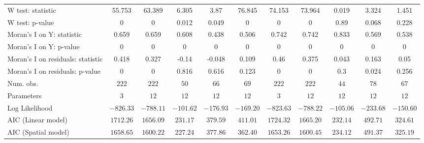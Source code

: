 \begin{table}
\begin{center}
\begin{tabular}{l c c c c c c c c c c}
W test: statistic                 & 55.753        & 63.389        & 6.305         & 3.87          & 76.845         & 74.153        & 73.964        & 0.019         & 3.324         & 1.451         \\
W test: p-value                   & 0             & 0             & 0.012         & 0.049         & 0              & 0             & 0             & 0.89          & 0.068         & 0.228         \\
Moran's I on Y: statistic         & 0.659         & 0.659         & 0.608         & 0.438         & 0.506          & 0.742         & 0.742         & 0.833         & 0.569         & 0.538         \\
Moran's I on Y: p-value           & 0             & 0             & 0             & 0             & 0              & 0             & 0             & 0             & 0             & 0             \\
Moran's I on residuals: statistic & 0.418         & 0.327         & -0.14         & -0.048        & 0.109          & 0.46          & 0.375         & 0.043         & 0.163         & 0.05          \\
Moran's I on residuals: p-value   & 0             & 0             & 0.816         & 0.616         & 0.123          & 0             & 0             & 0.3           & 0.024         & 0.256         \\
Num. obs.                         & $222$         & $222$         & $50$          & $66$          & $69$           & $222$         & $222$         & $44$          & $78$          & $67$          \\
Parameters                        & $3$           & $12$          & $12$          & $12$          & $12$           & $3$           & $12$          & $12$          & $12$          & $12$          \\
Log Likelihood                    & $-826.33$     & $-788.11$     & $-101.62$     & $-176.93$     & $-169.20$      & $-823.63$     & $-788.22$     & $-105.06$     & $-233.68$     & $-150.60$     \\
AIC (Linear model)                & $1712.26$     & $1656.09$     & $231.17$      & $379.59$      & $411.01$       & $1724.32$     & $1665.20$     & $232.14$      & $492.71$      & $324.61$      \\
AIC (Spatial model)               & $1658.65$     & $1600.22$     & $227.24$      & $377.86$      & $362.40$       & $1653.26$     & $1600.45$     & $234.12$      & $491.37$      & $325.19$      \\

\end{tabular}
\end{center}
\end{table}
